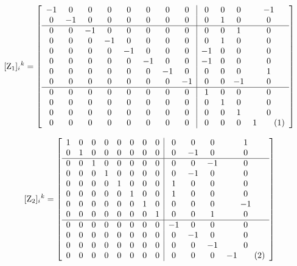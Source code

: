 \documentclass[12pt]{article}
\newcommand\numberthis{\addtocounter{equation}{1}\tag{\theequation}}
\let\bm\relax
\newcommand{\bm}[1]{{\boldsymbol{#1}}}
\begin{document}
\[[{\bm{\rm Z}_1}]_{i}{}^{k}= 
\left[\begin{array}{cccccccc|cccc}
 -1 & 0 & 0 & 0 & 0 & 0 & 0 & 0 & 0 & 0 & 0 & -1 \\
 0 & -1 & 0 & 0 & 0 & 0 & 0 & 0 & 0 & 1 & 0 & 0 \\
 \hline
 0 & 0 & -1 & 0 & 0 & 0 & 0 & 0 & 0 & 0 & 1 & 0 \\
 0 & 0 & 0 & -1 & 0 & 0 & 0 & 0 & 0 & 1 & 0 & 0 \\
 0 & 0 & 0 & 0 & -1 & 0 & 0 & 0 & -1 & 0 & 0 & 0 \\
 0 & 0 & 0 & 0 & 0 & -1 & 0 & 0 & -1 & 0 & 0 & 0 \\
 0 & 0 & 0 & 0 & 0 & 0 & -1 & 0 & 0 & 0 & 0 & 1 \\
 0 & 0 & 0 & 0 & 0 & 0 & 0 & -1 & 0 & 0 & -1 & 0 \\
 \hline
 0 & 0 & 0 & 0 & 0 & 0 & 0 & 0 & 1 & 0 & 0 & 0 \\
 0 & 0 & 0 & 0 & 0 & 0 & 0 & 0 & 0 & 1 & 0 & 0 \\
 0 & 0 & 0 & 0 & 0 & 0 & 0 & 0 & 0 & 0 & 1 & 0 \\
 0 & 0 & 0 & 0 & 0 & 0 & 0 & 0 & 0 & 0 & 0 & 1 
\numberthis\end{array}\right] \]

\[[{\bm{\rm Z}_2}]_{i}{}^{k}= 
\left[\begin{array}{cccccccc|cccc}
 1 & 0 & 0 & 0 & 0 & 0 & 0 & 0 & 0 & 0 & 0 & 1 \\
 0 & 1 & 0 & 0 & 0 & 0 & 0 & 0 & 0 & -1 & 0 & 0 \\
 \hline
 0 & 0 & 1 & 0 & 0 & 0 & 0 & 0 & 0 & 0 & -1 & 0 \\
 0 & 0 & 0 & 1 & 0 & 0 & 0 & 0 & 0 & -1 & 0 & 0 \\
 0 & 0 & 0 & 0 & 1 & 0 & 0 & 0 & 1 & 0 & 0 & 0 \\
 0 & 0 & 0 & 0 & 0 & 1 & 0 & 0 & 1 & 0 & 0 & 0 \\
 0 & 0 & 0 & 0 & 0 & 0 & 1 & 0 & 0 & 0 & 0 & -1 \\
 0 & 0 & 0 & 0 & 0 & 0 & 0 & 1 & 0 & 0 & 1 & 0 \\
 \hline
 0 & 0 & 0 & 0 & 0 & 0 & 0 & 0 & -1 & 0 & 0 & 0 \\
 0 & 0 & 0 & 0 & 0 & 0 & 0 & 0 & 0 & -1 & 0 & 0 \\
 0 & 0 & 0 & 0 & 0 & 0 & 0 & 0 & 0 & 0 & -1 & 0 \\
 0 & 0 & 0 & 0 & 0 & 0 & 0 & 0 & 0 & 0 & 0 & -1
\numberthis\end{array}\right] \]
\end{document}
